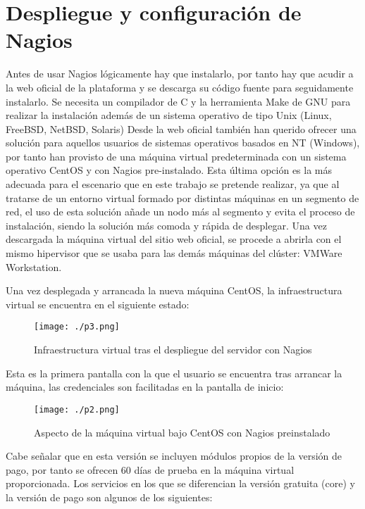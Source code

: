 \documentclass[paper=a4, fontsize=12pt]{scrartcl} %
\begin{document}
\section{Despliegue y configuración de Nagios}

Antes de usar Nagios lógicamente hay que instalarlo, por tanto hay que acudir a la web oficial de la plataforma y se descarga su código fuente para seguidamente instalarlo. Se necesita un compilador de C y la herramienta Make de GNU para realizar la instalación además de un sistema operativo de tipo Unix (Linux, FreeBSD, NetBSD, Solaris) \cite{p1}
Desde la web oficial también han querido ofrecer una solución para aquellos usuarios de sistemas operativos basados en NT (Windows), por tanto han provisto de una máquina virtual predeterminada con un sistema operativo CentOS y con Nagios pre-instalado.
Esta última opción es la más adecuada para el escenario que en este trabajo se pretende realizar, ya que al tratarse de un entorno virtual formado por distintas máquinas en un segmento de red, el uso de esta solución añade un nodo más al segmento y evita el proceso de instalación, siendo la solución más comoda y rápida de desplegar. \cite{p2}
Una vez descargada la máquina virtual del sitio web oficial, se procede a abrirla con el mismo hipervisor que se usaba para las demás máquinas del clúster: VMWare Workstation.

Una vez desplegada y arrancada la nueva máquina CentOS, la infraestructura virtual se encuentra en el siguiente estado:

\begin{figure}[H] %
	\centering
	\label{lsblk}
	\texttt{[image: ./p3.png]}
	\caption{Infraestructura virtual tras el despliegue del servidor con Nagios} 
\end{figure}

Esta es la primera pantalla con la que el usuario se encuentra tras arrancar la máquina, las credenciales son facilitadas en la pantalla de inicio:

\begin{figure}[H] %
	\centering
	\label{lsblk}
	\texttt{[image: ./p2.png]}
	\caption{Aspecto de la máquina virtual bajo CentOS con Nagios preinstalado} 
\end{figure}

Cabe señalar que en esta versión se incluyen módulos propios de la versión de pago, por tanto se ofrecen 60 días de prueba en la máquina virtual proporcionada. Los servicios en los que se diferencian la versión gratuita (core) y la versión de pago son algunos de los siguientes: \cite{p6}
\end{document}
